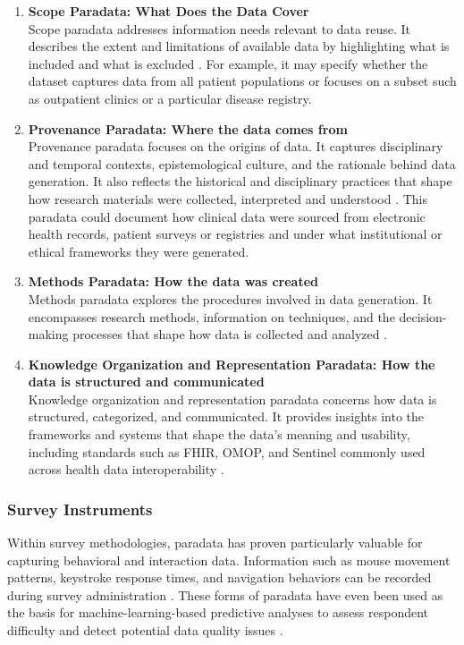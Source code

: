 \begin{enumerate}
    \item \textbf{Scope Paradata: What Does the Data Cover}\\
    Scope paradata addresses information needs relevant to data reuse. It describes the extent and limitations of available data by highlighting what is included and what is excluded \cite{huvila_perspectives_2024}.
    For example, it may specify whether the dataset captures data from all patient populations or focuses on a subset such as outpatient clinics or a particular disease registry.
    
    \item \textbf{Provenance Paradata: Where the data comes from}\\
    Provenance paradata focuses on the origins of data. It captures disciplinary and temporal contexts, epistemological culture, and the rationale behind data generation. It also reflects the historical and disciplinary practices that shape how research materials were collected, interpreted and understood \cite{huvila_perspectives_2024}.
    This paradata could document how clinical data were sourced from electronic health records, patient surveys or registries and under what institutional or ethical frameworks they were generated.
    
    \item \textbf{Methods Paradata: How the data was created} \\
    Methods paradata explores the procedures involved in data generation. It encompasses research methods, information on techniques, and the decision-making processes that shape how data is collected and analyzed \cite{huvila_perspectives_2024}.
    
    \item \textbf{Knowledge Organization and Representation Paradata: How the data is structured and communicated}\\
    Knowledge organization and representation paradata concerns how data is structured, categorized, and communicated. It provides insights into the frameworks and systems that shape the data's meaning and usability, including standards such as FHIR, OMOP, and Sentinel commonly used across health data interoperability \cite{huvila_perspectives_2024}.
\end{enumerate}

\subsubsection{Survey Instruments}
Within survey methodologies, paradata has proven particularly valuable for capturing behavioral  and interaction data. Information such as mouse movement patterns, keystroke response times, and navigation behaviors can be recorded during survey administration \cite{fahmy2017using}. These forms of paradata have even been used as the basis for machine-learning-based predictive analyses to assess respondent difficulty and detect potential data quality issues \cite{fernandez2020predicting}.

